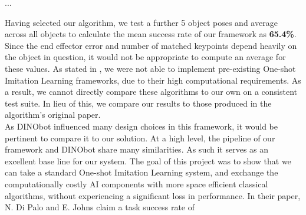 ...

Having selected our algorithm, we test a further 5 object poses and average across all objects to calculate the mean success rate of our framework as \textbf{65.4\%}. Since the end effector error and number of matched keypoints depend heavily on the object in question, it would not be appropriate to compute an average for these values. As stated in , we were not able to implement pre-existing One-shot Imitation Learning frameworks, due to their high computational requirements. As a result, we cannot directly compare these algorithms to our own on a consistent test suite. In lieu of this, we compare our results to those produced in the algorithm's original paper.\\

As DINObot influenced many design choices in this framework, it would be pertinent to compare it to our solution. At a high level, the pipeline of our framework and DINObot share many similarities. As such it serves as an excellent base line for our system. The goal of this project was to show that we can take a standard One-shot Imitation Learning system, and exchange the computationally costly AI components with more space efficient classical algorithms, without experiencing a significant loss in performance. In their paper, N. Di Palo and E. Johns claim a task success rate of 




